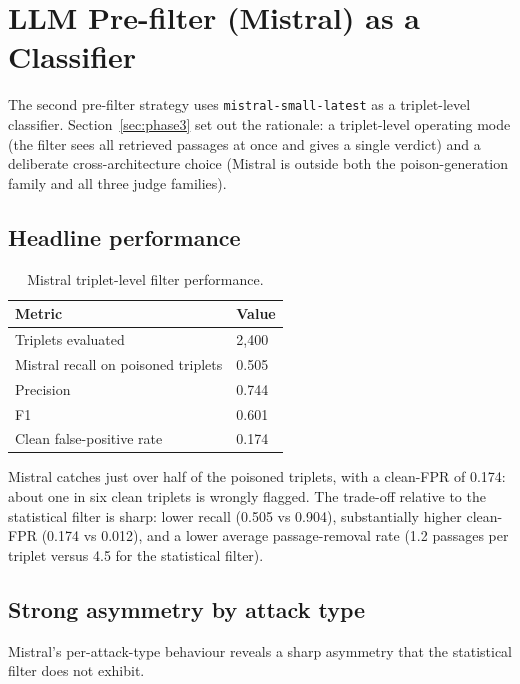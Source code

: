 \section{LLM Pre-filter (Mistral) as a Classifier}

The second pre-filter strategy uses \texttt{mistral-small-latest} as a triplet-level classifier. Section~\ref{sec:phase3} set out the rationale: a triplet-level operating mode (the filter sees all retrieved passages at once and gives a single verdict) and a deliberate cross-architecture choice (Mistral is outside both the poison-generation family and all three judge families).

\subsection{Headline performance}

\begin{table}[H]
\centering
\begin{tabular}{ll}
\toprule
Metric & Value \\
\midrule
Triplets evaluated & 2,400 \\
Mistral recall on poisoned triplets & 0.505 \\
Precision & 0.744 \\
F1 & 0.601 \\
Clean false-positive rate & 0.174 \\
\bottomrule
\end{tabular}
\caption{Mistral triplet-level filter performance.}
\label{tab:mistral-filter-performance}
\end{table}

Mistral catches just over half of the poisoned triplets, with a clean-FPR of 0.174: about one in six clean triplets is wrongly flagged. The trade-off relative to the statistical filter is sharp: lower recall (0.505 vs 0.904), substantially higher clean-FPR (0.174 vs 0.012), and a lower average passage-removal rate (1.2 passages per triplet versus 4.5 for the statistical filter).

\subsection{Strong asymmetry by attack type}

Mistral's per-attack-type behaviour reveals a sharp asymmetry that the statistical filter does not exhibit.

